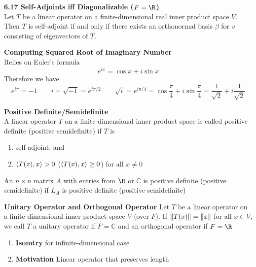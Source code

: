 \documentclass[11pt]{article}
\begin{document}
\begin{theorem*}
    \textbf{6.17 Self-Adjoints iff Diagonalizable ($F=\R$)} \\
    Let $T$ be a linear operator on a finite-dimensional real inner product space $V$. Then $T$ is self-adjoint if and only if there exists an orthonormal basis $\beta$ for $v$ consisting of eigenvectors of $T$.
\end{theorem*}


\begin{defn*}
    \textbf{Computing Squared Root of Imaginary Number} \\
    Relies on Euler's formula 
    \[
        e^{ix}=\cos x + i\sin x 
    \]
    Therefore we have 
    \[
        e^{i\pi} = -1 \qquad 
        i = \sqrt{-1} = e^{i\pi/2} \qquad 
        \sqrt{i} = e^{i \pi / 4} = \cos \frac{\pi}{4} + i \sin \frac{\pi}{4} = \frac{1}{\sqrt{2}} + i \frac{1}{\sqrt{2}}
    \]
\end{defn*}

\begin{defn*}
    \textbf{Positive Definite/Semidefinite} \\
    A linear operator $T$ on a finite-dimensional inner product space is called positive definite (positive semidefinite) if $T$ is 
    \begin{enumerate}
        \item self-adjoint, and 
        \item $\langle T(x),x\rangle >0$ ($\langle T(x),x\rangle \geq 0$) for all $x\neq 0$
    \end{enumerate}
    An $n\times n$ matrix $A$ with entries from $\R$ or $\mathbb{C}$ is positive definite (positive semidefinite) if $L_A$ is positive definite (positive semidefinite)
\end{defn*}




\begin{defn*}
    \textbf{Unitary Operator and Orthogonal Operator} Let $T$ be a linear operator on a finite-dimensional inner product space $V$ (over $F$). If $\left\lVert T(x)\right\rVert = \left\lVert x\right\rVert$ for all $x\in V$, we call $T$ a unitary operator if $F = \mathbb{C}$ and an orthogonal operator if $F = \R$
    \begin{enumerate}
        \item \textbf{Isomtry} for infinite-dimensional case 
        \item \textbf{Motivation} Linear operator that preserves length 
    \end{enumerate}
\end{defn*}
\end{document}
